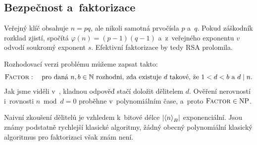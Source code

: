 \subsection{Bezpečnost a~faktorizace}

Veřejný klíč obsahuje $n=pq$, ale nikoli samotná prvočísla $p$ a~$q$. Pokud záškodník rozklad zjistí, spočítá $\varphi(n)=(p-1)(q-1)$ a~z~veřejného exponentu $v$ odvodí soukromý exponent $s$. Efektivní faktorizace by tedy RSA prolomila.

Rozhodovací verzi problému můžeme zapsat takto:
\[
    \textsc{Factor}:
    \quad
    \text{pro daná }n,b\in\mathbb{N}\text{ rozhodni, zda existuje }d
    \text{ takové, že }1<d<b\text{ a }d\mid n.
\]
Jak jsme viděli v~, kladnou odpověď stačí doložit dělitelem $d$. Ověření nerovností i~rovnosti $n\bmod d=0$ proběhne v~polynomiálním čase, a~proto $\textsc{Factor}\in\operatorname{NP}$.

Naivní zkoušení dělitelů je vzhledem k~bitové délce $\left| \left\langle n\right\rangle_B \right|$ exponenciální. Jsou známy podstatně rychlejší klasické algoritmy, žádný obecný polynomiální klasický algoritmus pro faktorizaci však znám není.


